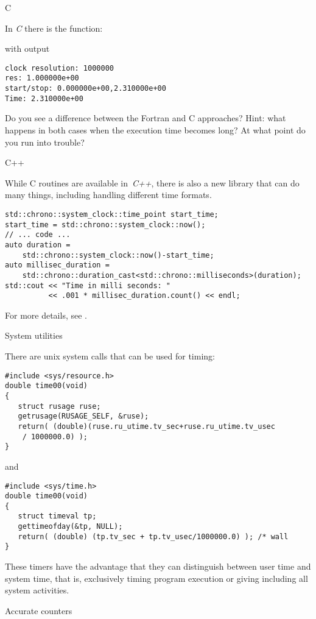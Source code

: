  {C}

In \emph{C} there is the  function:

with output
\begin{verbatim}
clock resolution: 1000000
res: 1.000000e+00
start/stop: 0.000000e+00,2.310000e+00
Time: 2.310000e+00
\end{verbatim}
Do you see a difference between the Fortran and C approaches? Hint:
what happens in both cases when the execution time becomes long? At
what point do you run into trouble?

 {C++}

While C routines are available in~\emph{C++}, there is also a new
 library that can do many things, including
handling different time formats.
\begin{verbatim}
std::chrono::system_clock::time_point start_time;
start_time = std::chrono::system_clock::now();
// ... code ...
auto duration =
    std::chrono::system_clock::now()-start_time;
auto millisec_duration =
    std::chrono::duration_cast<std::chrono::milliseconds>(duration);
std::cout << "Time in milli seconds: " 
          << .001 * millisec_duration.count() << endl;
\end{verbatim}
For more details, see .

 {System utilities}

There are unix system calls that can be used for timing:
\begin{verbatim}
#include <sys/resource.h>                        
double time00(void)                              
{                                                
   struct rusage ruse;
   getrusage(RUSAGE_SELF, &ruse);
   return( (double)(ruse.ru_utime.tv_sec+ruse.ru_utime.tv_usec
    / 1000000.0) );
}
\end{verbatim}
and 
\begin{verbatim}
#include <sys/time.h>
double time00(void)
{
   struct timeval tp;
   gettimeofday(&tp, NULL);
   return( (double) (tp.tv_sec + tp.tv_usec/1000000.0) ); /* wall
}
\end{verbatim}
These timers have the advantage that they can
distinguish between user time and system time, that is, exclusively
timing program execution or giving 
including all system activities.


 {Accurate counters}

